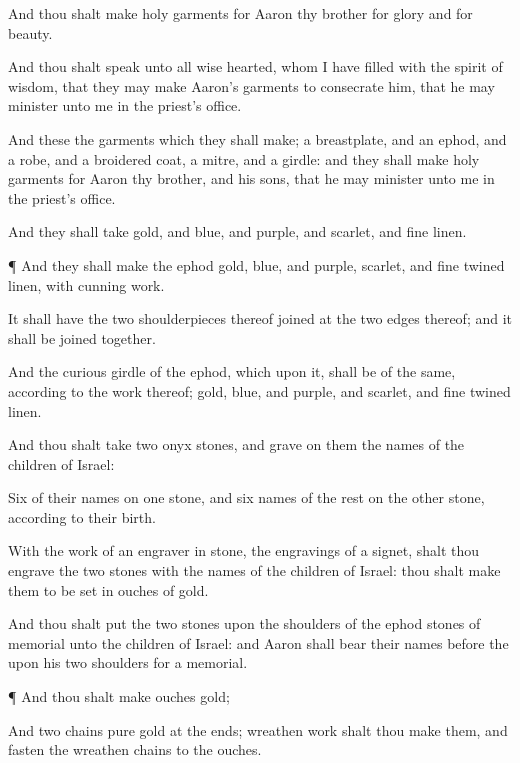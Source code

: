 {And thou shalt
make
holy
garments for
Aaron thy
brother for
glory and for
beauty.

And thou shalt
speak unto all
{}
wise
hearted, whom I have
filled with the
spirit of
wisdom, that they may
make
Aaron’s
garments to
consecrate him, that he may minister unto me in the
priest’s office.

And these
{} the
garments which they shall
make; a
breastplate, and an
ephod, and a
robe, and a
broidered
coat, a
mitre, and a
girdle: and they shall
make
holy
garments for
Aaron thy
brother, and his
sons, that he may minister unto me in the
priest’s office.

And they shall
take
gold, and
blue, and
purple, and
scarlet, and fine
linen.


\par }{\PP {}¶ And they shall
make the
ephod
{}
gold,
{}
blue, and
{}
purple,
{}
scarlet, and fine
twined
linen, with
cunning
work.

It shall have the
two
shoulderpieces thereof
joined at the
two
edges thereof; and
{} it shall be joined
together.

And the curious
girdle of the
ephod, which
{} upon it, shall be of the same, according to the
work thereof;
{}
gold,
{}
blue, and
purple, and
scarlet, and fine
twined
linen.

And thou shalt
take
two
onyx
stones, and
grave on them the
names of the
children of
Israel:

Six of their
names on
one
stone, and
{}
six
names of the
rest on the
other
stone, according to their
birth.

With the
work of an
engraver in
stone,
{} the
engravings of a
signet, shalt thou
engrave the
two
stones with the
names of the
children of
Israel: thou shalt
make them to be
set in
ouches of
gold.

And thou shalt
put the
two
stones upon the
shoulders of the
ephod
{}
stones of
memorial unto the
children of
Israel: and
Aaron shall
bear their
names
before the
{} upon his
two
shoulders for a
memorial.


\par }{\PP {}¶ And thou shalt
make
ouches
{}
gold;

And
two
chains
{}
pure
gold at the
ends;
{}
wreathen
work shalt thou
make them, and
fasten the
wreathen
chains to the
ouches.


}

